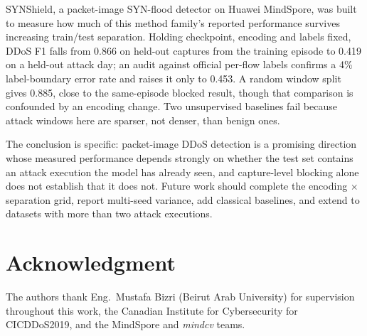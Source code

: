 \documentclass[conference]{IEEEtran} \IEEEoverridecommandlockouts
\begin{document}
SYNShield, a packet-image SYN-flood detector on Huawei MindSpore, was built to
measure how much of this method family's reported performance survives
increasing train/test separation. Holding checkpoint, encoding and labels
fixed, DDoS F1 falls from 0.866 on held-out captures from the training episode
to 0.419 on a held-out attack day; an audit against official per-flow labels
confirms a 4\% label-boundary error rate and raises it only to 0.453. A random
window split gives 0.885, close to the same-episode blocked result, though that
comparison is confounded by an encoding change. Two unsupervised baselines fail
because attack windows here are sparser, not denser, than benign ones.

The conclusion is specific: packet-image DDoS detection is a promising
direction whose measured performance depends strongly on whether the test set
contains an attack execution the model has already seen, and capture-level
blocking alone does not establish that it does not. Future work should complete
the encoding $\times$ separation grid, report multi-seed variance, add
classical baselines, and extend to datasets with more than two attack
executions.

\section*{Acknowledgment} The authors thank Eng.\ Mustafa Bizri (Beirut Arab University) for supervision
throughout this work, the Canadian Institute for Cybersecurity for CICDDoS2019,
and the MindSpore and \emph{mindcv} teams.
\end{document}
